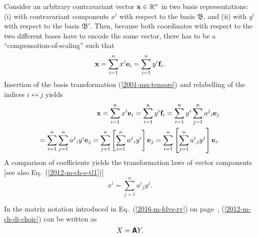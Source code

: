 Consider an arbitrary contravariant vector ${\bf x} \in {\Bbb R}^n$ in two basis representations:
(i)
with contravariant components $x^i$ with respect to the basis
${\mathfrak B}$,
and  (ii) with ${ y }^i$  with respect to the basis
${\mathfrak B'}$.
Then, because both coordinates with respect to the two different bases
have to encode the same vector, there has to be a ``compensation-of-scaling'' such that
\begin{equation}
{\bf x}
=\sum_{i=1}^n x^i {\bf e}_i
=\sum_{i=1}^n { y }^i {\bf f}_i
.
\end{equation}
Insertion of the basis transformation (\ref{2001-mu-tensors}) and
relabelling of the indices $i \leftrightarrow j$ yields
\begin{equation}
\begin{split}
{\bf x}
=\sum_{i=1}^n x^i {\bf e}_i
=\sum_{i=1}^n { y }^i {\bf f}_i
=\sum_{i=1}^n { y }^i \sum_{j=1}^n {a^j}_i {\bf e}_j\\
=
\sum_{i=1}^n\sum_{j=1}^n {a^j}_i { y }^i  {\bf e}_j
=
\sum_{j=1}^n\left[ \sum_{i=1}^n {a^j}_i  { y }^i \right] {\bf e}_j
=
\sum_{i=1}^n\left[ \sum_{j=1}^n {a^i}_j  { y }^j \right] {\bf e}_i
.
\end{split}
\label{2016-m-ch-tensor-tcvc}
\end{equation}
A comparison of coefficients
yields the transformation laws of vector components
[see also Eq.~(\ref{2012-m-ch-e-tl1})]
\begin{equation}
x^i   = \sum_{j=1}^n {a^i}_j  { y }^j .
\label{2012-m-ch-di-choic}
\end{equation}

In the matrix notation introduced in Eq.~(\ref{2016-m-fdvs-rv}) on page~\pageref{2016-m-fdvs-rv},
(\ref{2012-m-ch-di-choic}) can  be written as
\begin{equation}
X   =  \textsf{\textbf{A}}  Y .
\label{2016-m-ch-di-choic-mn}
\end{equation}



